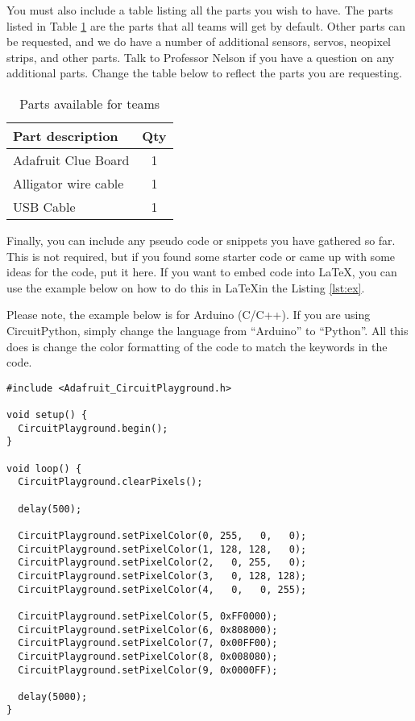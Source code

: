 \documentclass[12pt]{article}
\begin{document}
You must also include a table listing all the parts you wish to have. The parts listed in Table \ref{table:parts_list} are the parts that all teams will get by default. Other parts can be requested, and we do have a number of additional sensors, servos, neopixel strips, and other parts. Talk to Professor Nelson if you have a question on any additional parts. Change the table below to reflect the parts you are requesting.

\begin{table}[ht]
  \caption{Parts available for teams}
  \label{table:parts_list}
  \begin{center}
  \begin{tabular}{|p{3in}|c|}
  
  \hline
  Part description & Qty\\
  \hline
  \hline
  Adafruit Clue Board & 1 \\
  \hline
  Alligator wire cable  & 1 \\
  \hline
  USB Cable & 1 \\
  \hline
  \end{tabular}
  \end{center}
\end{table}


Finally, you can include any pseudo code or snippets you have gathered so far. This is not required, but if you found some starter code or came up with some ideas for the code, put it here. If you want to embed code into \LaTeX, you can use the example below on how to do this in \LaTeX in the Listing \ref{lst:ex}.

Please note, the example below is for Arduino (C/C++). If you are using CircuitPython, simply change the language from ``Arduino'' to ``Python''. All this does is change the color formatting of the code to match the keywords in the code. 

\begin{lstlisting}[caption={An example of putting code in your report.},label={lst:ex},language=Arduino]
#include <Adafruit_CircuitPlayground.h>

void setup() {
  CircuitPlayground.begin();
}

void loop() {
  CircuitPlayground.clearPixels();

  delay(500);

  CircuitPlayground.setPixelColor(0, 255,   0,   0);
  CircuitPlayground.setPixelColor(1, 128, 128,   0);
  CircuitPlayground.setPixelColor(2,   0, 255,   0);
  CircuitPlayground.setPixelColor(3,   0, 128, 128);
  CircuitPlayground.setPixelColor(4,   0,   0, 255);
  
  CircuitPlayground.setPixelColor(5, 0xFF0000);
  CircuitPlayground.setPixelColor(6, 0x808000);
  CircuitPlayground.setPixelColor(7, 0x00FF00);
  CircuitPlayground.setPixelColor(8, 0x008080);
  CircuitPlayground.setPixelColor(9, 0x0000FF);
 
  delay(5000);
}
\end{lstlisting}
\end{document}
